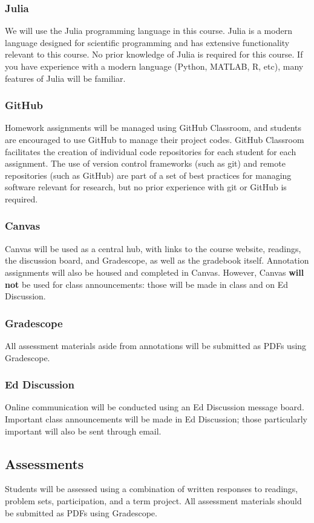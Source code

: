 \documentclass[12pt,a4paper]{article}
\begin{document}
\subsubsection{Julia}
We will use the Julia programming language in this course. Julia is a modern language designed for scientific programming and has extensive functionality relevant to this course. No prior knowledge of Julia is required for this course. If you have experience with a modern language (Python, MATLAB, R, etc), many features of Julia will be familiar.

\subsubsection{GitHub}
Homework assignments will be managed using GitHub Classroom, and students are encouraged to use GitHub to manage their project codes. GitHub Classroom facilitates the creation of individual code repositories for each student for each assignment. The use of version control frameworks (such as git) and remote repositories (such as GitHub) are part of a set of best practices for managing software relevant for research, but no prior experience with git or GitHub is required.

\subsubsection{Canvas}
Canvas will be used as a central hub, with links to the course website, readings, the discussion board, and Gradescope, as well as the gradebook itself. Annotation assignments will also be housed and completed in Canvas. However, Canvas \textbf{will not} be used for class announcements: those will be made in class and on Ed Discussion.

\subsubsection{Gradescope}
All assessment materials aside from annotations will be submitted as PDFs using Gradescope.

\subsubsection{Ed Discussion}
Online communication will be conducted using an Ed Discussion message board. Important class announcements will be made in Ed Discussion; those particularly important will also be sent through email.

\subsection{Assessments}
Students will be assessed using a combination of written responses to readings, problem sets, participation, and a term project. All assessment materials should be submitted as PDFs using Gradescope. 
\end{document}
